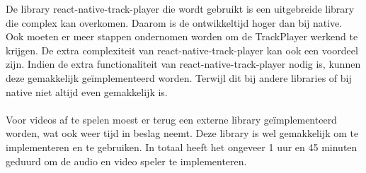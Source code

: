 De library react-native-track-player die wordt gebruikt is een uitgebreide library
die complex kan overkomen. Daarom is de ontwikkeltijd hoger dan bij native.
Ook moeten er meer stappen ondernomen worden om de TrackPlayer werkend te krijgen.
De extra complexiteit van react-native-track-player kan ook een voordeel zijn. Indien de
extra functionaliteit van react-native-track-player nodig is, kunnen deze gemakkelijk geïmplementeerd worden.
Terwijl dit bij andere libraries of bij native niet altijd even gemakkelijk is.
\\\\
Voor videos af te spelen moest er terug een externe library geïmplementeerd worden, wat ook weer
tijd in beslag neemt. Deze library is wel gemakkelijk om te implementeren en te gebruiken.
In totaal heeft het ongeveer 1 uur en 45 minuten geduurd om de audio en video speler te implementeren.

